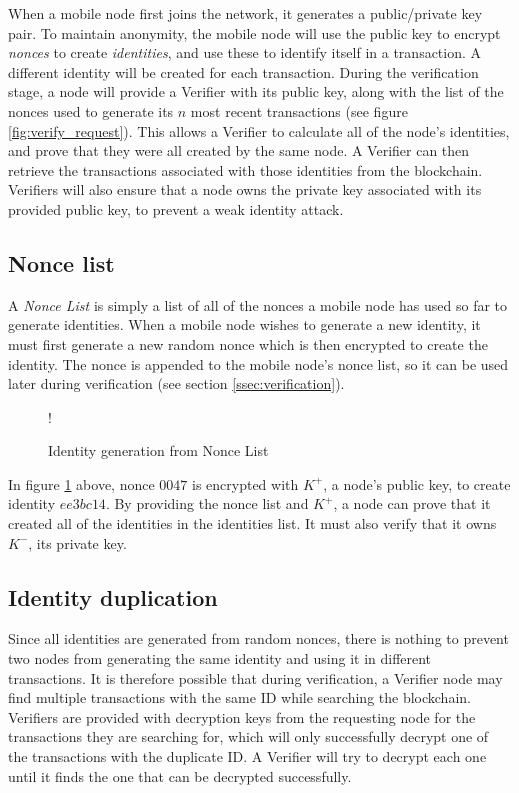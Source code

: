 When a mobile node first joins the network, it generates a public/private key pair. To maintain anonymity, the mobile node will use the public key to encrypt \textit{nonces} to create \textit{identities}, and use these to identify itself in a transaction. A different identity will be created for each transaction. During the verification stage, a node will provide a Verifier with its public key, along with the list of the nonces used to generate its $n$ most recent transactions (see figure \ref{fig:verify_request}). This allows a Verifier to calculate all of the node's identities, and prove that they were all created by the same node. A Verifier can then retrieve the transactions associated with those identities from the blockchain. Verifiers will also ensure that a node owns the private key associated with its provided public key, to prevent a weak identity attack.

\subsection{Nonce list} \label{sssec:nonce_list}
A \textit{Nonce List} is simply a list of all of the nonces a mobile node has used so far to generate identities. When a mobile node wishes to generate a new identity, it must first generate a new random nonce which is then encrypted to create the identity. The nonce is appended to the mobile node's nonce list, so it can be used later during verification (see section \ref{ssec:verification}).

\begin{figure}[H]
\resizebox {\columnwidth} {!} {}
\caption{Identity generation from Nonce List}
\label{fig:nonce_list}
\end{figure}

In figure \ref{fig:nonce_list} above, nonce $0047$ is encrypted with $K^+$, a node's public key, to create identity $ee3bc14$. By providing the nonce list and $K^+$, a node can prove that it created all of the identities in the identities list. It must also verify that it owns $K^-$, its private key.

\subsection{Identity duplication}
Since all identities are generated from random nonces, there is nothing to prevent two nodes from generating the same identity and using it in different transactions. It is therefore possible that during verification, a Verifier node may find multiple transactions with the same ID while searching the blockchain. Verifiers are provided with decryption keys from the requesting node for the transactions they are searching for, which will only successfully decrypt one of the transactions with the duplicate ID. A Verifier will try to decrypt each one until it finds the one that can be decrypted successfully.


